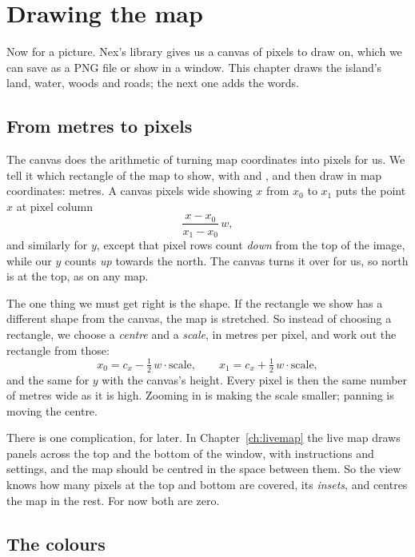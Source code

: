 \chapter{Drawing the map}\label{ch:drawing}

Now for a picture. Nex's  library gives us a canvas
of pixels to draw on, which we can save as a PNG file or show in a window.
This chapter draws the island's land, water, woods and roads; the next one
adds the words.

\section{From metres to pixels}

The canvas does the arithmetic of turning map coordinates into pixels for
us. We tell it which rectangle of the map to show, with
 and , and then draw
in map coordinates: metres. A canvas  pixels wide showing $x$ from
$x_0$ to $x_1$ puts the point $x$ at pixel column
\[
  \frac{x - x_0}{x_1 - x_0}\, w,
\]
and similarly for $y$, except that pixel rows count \emph{down} from the
top of the image, while our $y$ counts \emph{up} towards the north. The
canvas turns it over for us, so north is at the top, as on any map.

The one thing we must get right is the shape. If the rectangle we show
has a different shape from the canvas, the map is stretched. So instead of
choosing a rectangle, we choose a \emph{centre} and a \emph{scale}, in
metres per pixel, and work out the rectangle from those:
\[
  x_0 = c_x - \tfrac{1}{2}\, w \cdot \text{scale}, \qquad
  x_1 = c_x + \tfrac{1}{2}\, w \cdot \text{scale},
\]
and the same for $y$ with the canvas's height. Every pixel is then the same
number of metres wide as it is high. Zooming in is making the scale
smaller; panning is moving the centre.

There is one complication, for later. In Chapter~\ref{ch:livemap} the live
map draws panels across the top and the bottom of the window, with
instructions and settings, and the map should be centred in the space
between them. So the view knows how many pixels at the top and bottom are
covered, its \emph{insets}, and centres the map in the rest. For now both
are zero.

\section{The colours}

